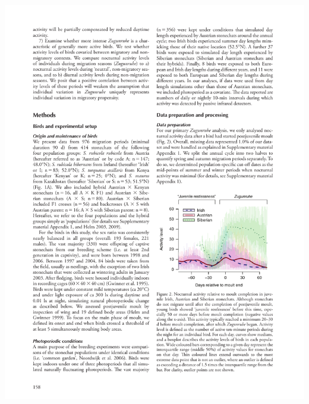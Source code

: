 \documentclass[a4paper, twoside]{templates/ociamthesis}
\begin{document}
\begin{center}\includegraphics[width=1\linewidth]{pdf_chapters/zug/zug_crop_Part04} \end{center}
\end{document}
